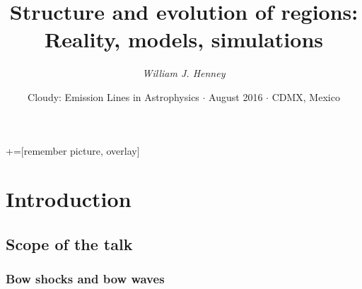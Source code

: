 \documentclass[presentation]{beamer}
\title[\hii{} regions]{Structure and evolution of \hii{} regions:\\
  Reality, models, simulations}
\author{\textit{William J. Henney}}
\date[Cloudy 2016]{
  Cloudy: Emission Lines in Astrophysics
  \(\cdot\) August 2016 \(\cdot\) CDMX, Mexico
}
\institute[IRyA, UNAM, Mexico]
{
  \structure{Instituto de Radioastronomía y Astrofísica\\
    UNAM, Morelia, México}
}
\begin{document}
\maketitle

+=[remember picture, overlay]

\section{Introduction}

\subsection{Scope of the talk}

\begin{frame}
  \frametitle{Bow shocks and bow waves}
\end{frame}
\end{document}
